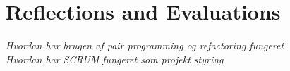 \chapter{Reflections and Evaluations}
\textit{Hvordan har brugen af pair programming og refactoring fungeret\\
Hvordan har SCRUM fungeret som projekt styring\\
}
